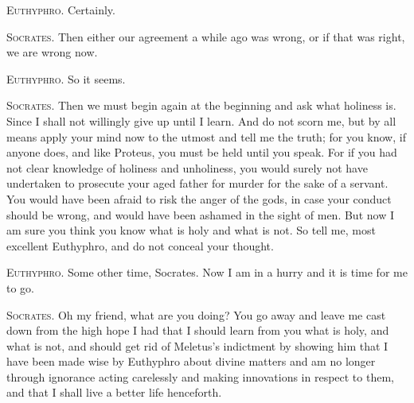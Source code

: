 \textsc{Euthyphro}. Certainly.

\textsc{Socrates}. Then either our agreement a while ago was wrong, or
if that was right, we are wrong now.

\textsc{Euthyphro}. So it seems.

\textsc{Socrates}. Then we must begin again at the beginning and ask
what holiness is. Since I shall not willingly give up until I learn.
And do not scorn me, but by all means apply your mind now to the
utmost and tell me the truth; for you know, if anyone does, and like
Proteus, you must be held until you speak. For if you had not clear
knowledge of holiness and unholiness, you would surely not have
undertaken to prosecute your aged father for murder for the sake of a
servant. You would have been afraid to risk the anger of the gods, in
case your conduct should be wrong, and would have been ashamed in the
sight of men. But now I am sure you think you know what is holy and
what is not. So tell me, most excellent Euthyphro, and do not conceal
your thought.

\textsc{Euthyphro}. Some other time, Socrates. Now I am in a hurry and
it is time for me to go.

\textsc{Socrates}. Oh my friend, what are you doing? You go away and
leave me cast down from the high hope I had that I should learn from
you what is holy, and what is not, and should get rid of Meletus's
indictment by showing him that I have been made wise by Euthyphro
about divine matters and am no longer through ignorance acting
carelessly and making innovations in respect to them, and that I shall
live a better life henceforth.

